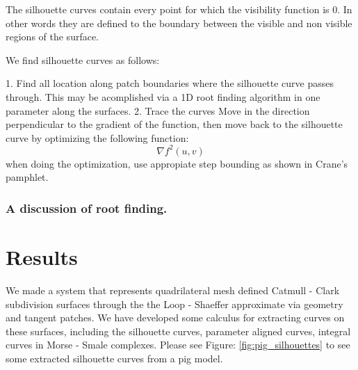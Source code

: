 \documentclass[12pt, letterpaper]{article}
\begin{document}
		The silhouette curves contain every point for which the visibility function is 0. In other words they are defined to the boundary between the visible and non visible regions of the surface.
		
		We find silhouette curves as follows:
		
		1. Find all location along patch boundaries where the silhouette curve passes through. This may be acomplished via a 1D root finding algorithm in one parameter along the surfaces.
		2. Trace the curves
			Move in the direction perpendicular to the gradient of the function, then move back to the silhouette curve by optimizing the following function:
		$$\nabla f^{2}(u, v)$$ when doing the optimization, use appropiate step bounding as shown in Crane's pamphlet.
		
		\subsubsection{A discussion of root finding.}


\section{Results}

We made a system that represents quadrilateral mesh defined Catmull - Clark subdivision surfaces through the the Loop - Shaeffer approximate via geometry and tangent patches.
We have developed some calculus for extracting curves on these surfaces, including the silhouette curves, parameter aligned curves, integral curves in
Morse - Smale complexes.
Please see Figure: \ref{fig:pig_silhouettes} to see some extracted silhouette curves from a pig model.
\end{document}
